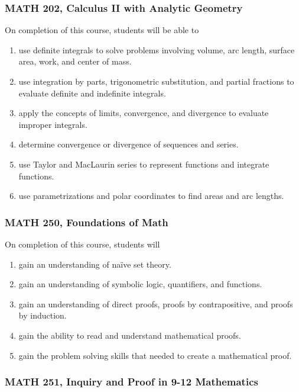 \documentclass[11pt]{article}
\newenvironment{alphalist}{
\begin{enumerate}[label=(\arabic*),widest=107 ,leftmargin=25pt, itemsep=0pt]}
{\end{enumerate}}
\begin{document}
\subsubsection*{MATH 202, Calculus II with Analytic Geometry}

 On completion of this course, students will be able to
 \begin{alphalist}
    \item use definite integrals to solve problems involving volume, arc length, 
       surface area, work, and center of mass. 
    \item use integration by parts, trigonometric substitution, and partial fractions 
        to evaluate definite and indefinite integrals.
    \item apply the concepts of limits, convergence, and divergence to evaluate 
        improper integrals.
    \item determine convergence or divergence of sequences and series.
    \item use Taylor and MacLaurin series to represent functions and integrate 
        functions.
    \item use parametrizations and polar coordinates to find areas and arc lengths.
 \end{alphalist}

\subsubsection*{MATH 250, Foundations of Math}


On completion of this course, students will
\begin{alphalist}
    \item gain an understanding of naïve set theory. 
    \item gain an understanding of symbolic logic, quantifiers, and functions.
    \item gain an understanding of direct proofs, proofs by contrapositive, and proofs by induction.
    \item gain the ability to read and understand mathematical proofs.
    \item gain the problem solving skills that needed to create a mathematical proof.
\end{alphalist}

\subsubsection*{MATH 251, Inquiry and Proof in 9-12 Mathematics}
\end{document}
